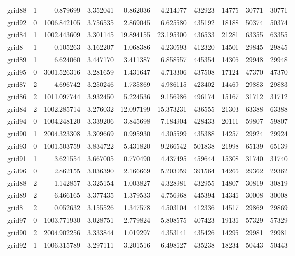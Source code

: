 \documentclass[../../../thesis.tex]{subfiles}
\begin{document}
\begin{longtable}{|l|r|r|r|r|r|r|r|r|r|}
grid88 & 1 & 0.879699 & 3.352041 & 0.862036 & 4.214077 & 432923 & 14775 & 30771 & 30771 \\
grid92 & 0 & 1006.842105 & 3.756535 & 2.869045 & 6.625580 & 435192 & 18188 & 50374 & 50374 \\
grid84 & 1 & 1002.443609 & 3.301145 & 19.894155 & 23.195300 & 436533 & 21281 & 63355 & 63355 \\
grid8 & 1 & 0.105263 & 3.162207 & 1.068386 & 4.230593 & 412320 & 14501 & 29845 & 29845 \\
grid89 & 1 & 6.624060 & 3.447170 & 3.411387 & 6.858557 & 445354 & 14306 & 29948 & 29948 \\
grid95 & 0 & 3001.526316 & 3.281659 & 1.431647 & 4.713306 & 437508 & 17124 & 47370 & 47370 \\
grid87 & 2 & 4.696742 & 3.250246 & 1.735869 & 4.986115 & 423402 & 14469 & 29883 & 29883 \\
grid86 & 2 & 1011.097744 & 3.932450 & 5.224536 & 9.156986 & 496174 & 15167 & 31712 & 31712 \\
grid84 & 2 & 1002.285714 & 3.276032 & 12.097199 & 15.373231 & 436555 & 21303 & 63388 & 63388 \\
grid94 & 0 & 1004.248120 & 3.339206 & 3.845698 & 7.184904 & 428433 & 20111 & 59807 & 59807 \\
grid90 & 1 & 2004.323308 & 3.309669 & 0.995930 & 4.305599 & 435388 & 14257 & 29924 & 29924 \\
grid93 & 0 & 1001.503759 & 3.834722 & 5.431820 & 9.266542 & 501838 & 21998 & 65139 & 65139 \\
grid91 & 1 & 3.621554 & 3.667005 & 0.770490 & 4.437495 & 459644 & 15308 & 31740 & 31740 \\
grid96 & 0 & 2.862155 & 3.036390 & 2.166669 & 5.203059 & 391564 & 14266 & 29362 & 29362 \\
grid88 & 2 & 1.142857 & 3.325154 & 1.003827 & 4.328981 & 432955 & 14807 & 30819 & 30819 \\
grid89 & 2 & 6.466165 & 3.377435 & 1.379533 & 4.756968 & 445394 & 14346 & 30008 & 30008 \\
grid8 & 2 & 0.052632 & 3.155526 & 1.347578 & 4.503104 & 412336 & 14517 & 29869 & 29869 \\
grid97 & 0 & 1003.771930 & 3.028751 & 2.779824 & 5.808575 & 407423 & 19136 & 57329 & 57329 \\
grid90 & 2 & 2004.902256 & 3.333844 & 1.019297 & 4.353141 & 435426 & 14295 & 29981 & 29981 \\
grid92 & 1 & 1006.315789 & 3.297111 & 3.201516 & 6.498627 & 435238 & 18234 & 50443 & 50443 \\

\end{longtable}
\end{document}
